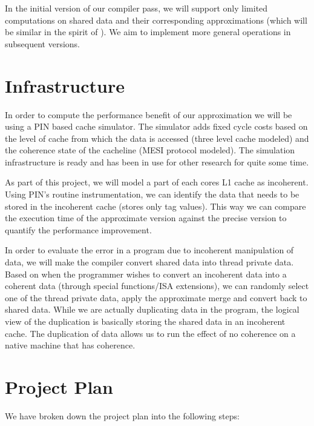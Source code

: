 \documentclass[12pt,conference]{IEEEtran}
\begin{document}
In the initial version of our compiler pass, we will 
support only limited computations on shared data and their
corresponding approximations (which will be similar in the 
spirit of \cite{paraprox}). We aim to implement more
general operations in subsequent versions.

\section{Infrastructure}

In order to compute the performance benefit of our approximation
we will be using a PIN based cache simulator. The simulator adds 
fixed cycle costs based on the level of cache from which the
data is accessed (three level cache modeled) and the coherence
state of the cacheline (MESI protocol modeled). The simulation
infrastructure is ready and has been in use for other research
for quite some time.

As part of this project, we will model a part of each cores
L1 cache as incoherent. Using PIN's routine instrumentation,
we can identify the data that needs to be stored in the incoherent
cache (stores only tag values). This way we can compare the 
execution time of the approximate version against the precise
version to quantify the performance improvement.

In order to evaluate the error in a program due to incoherent 
manipulation of data, we will make the compiler convert 
shared data into thread private data. Based on when the programmer
wishes to convert an incoherent data into a coherent data (through 
special functions/ISA extensions), we can randomly select one
of the thread private data, apply the approximate merge and convert
back to shared data. While we are actually duplicating data in 
the program, the logical view of the duplication is basically
storing the shared data in an incoherent cache. The duplication of data
allows us to run the effect of no coherence on a native machine
that has coherence.


\section{Project Plan}

We have broken down the project plan into the following steps:
\end{document}
